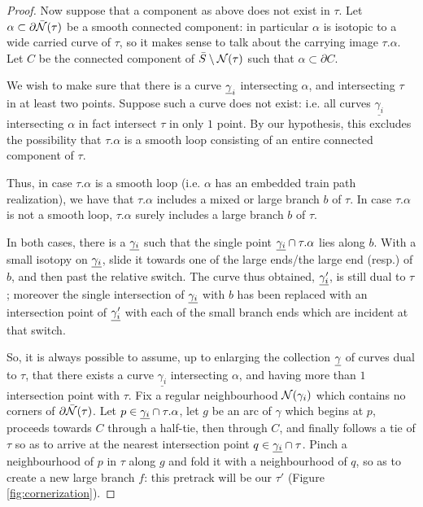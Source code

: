 \begin{proof}
Now suppose that a component as above does not exist in $\tau$. Let $\alpha\subset\partial\bar{{\mathcal N}}(\tau)$ be a smooth connected component: in particular $\alpha$ is isotopic to a wide carried curve of $\tau$, so it makes sense to talk about the carrying image $\tau.\alpha$. Let $C$ be the connected component of $\bar S\setminus{\mathcal N}(\tau)$ such that $\alpha\subset\partial C$.

We wish to make sure that there is a curve $\underline{\gamma}_i$ intersecting $\alpha$, and intersecting $\tau$ in at least two points. Suppose such a curve does not exist: i.e. all curves $\underline{\gamma_i}$ intersecting $\alpha$ in fact intersect $\tau$ in only $1$ point. By our hypothesis, this excludes the possibility that $\tau.\alpha$ is a smooth loop consisting of an entire connected component of $\tau$.

Thus, in case $\tau.\alpha$ is a smooth loop (i.e. $\alpha$ has an embedded train path realization), we have that $\tau.\alpha$ includes a mixed or large branch $b$ of $\tau$. In case $\tau.\alpha$ is not a smooth loop, $\tau.\alpha$ surely includes a large branch $b$ of $\tau$.

In both cases, there is a $\underline{\gamma_i}$ such that the single point $\underline{\gamma_i}\cap \tau.\alpha$ lies along $b$. With a small isotopy on $\underline{\gamma_i}$, slide it towards one of the large ends/the large end (resp.) of $b$, and then past the relative switch. The curve thus obtained, $\underline{\gamma'_i}$, is still dual to $\tau$; moreover the single intersection of $\underline{\gamma_i}$ with $b$ has been replaced with an intersection point of $\underline{\gamma'_i}$ with each of the small branch ends which are incident at that switch.

So, it is always possible to assume, up to enlarging the collection $\underline{\gamma}$ of curves dual to $\tau$, that there exists a curve $\underline{\gamma_i}$ intersecting $\alpha$, and having more than $1$ intersection point with $\tau$. Fix a regular neighbourhood ${\mathcal N}(\gamma_i)$ which contains no corners of $\partial\bar{{\mathcal N}}(\tau)$. Let $p\in \underline{\gamma_i}\cap \tau.\alpha$, let $g$ be an arc of $\gamma$ which begins at $p$, proceeds towards $C$ through a half-tie, then through $C$, and finally follows a tie of $\tau$ so as to arrive at the nearest intersection point $q\in \underline{\gamma_i}\cap\tau$. Pinch a neighbourhood of $p$ in $\tau$ along $g$ and fold it with a neighbourhood of $q$, so as to create a new large branch $f$: this pretrack will be our $\tau'$ (Figure \ref{fig:cornerization}).


\end{proof}
